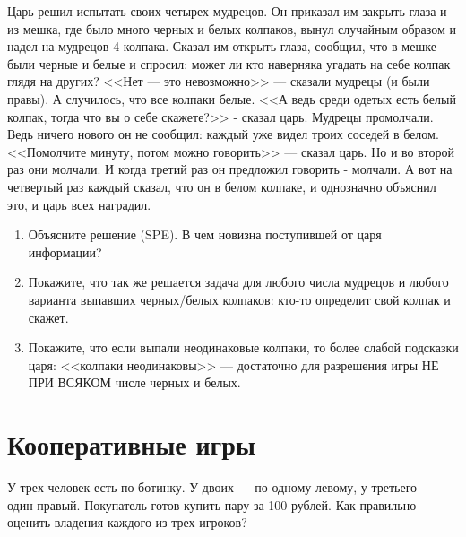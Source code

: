 \begin{problem} [Колпаки]
\begin{source} \cite{myerson:gtac} \end{source}
 Царь решил испытать своих
четырех мудрецов. Он приказал им закрыть глаза и из мешка,
где было много черных и белых колпаков, вынул случайным
образом и надел на мудрецов 4 колпака. Сказал им открыть
глаза, сообщил, что в мешке были черные и белые и спросил:
может ли кто наверняка угадать на себе колпак глядя на
других? <<Нет --- это невозможно>> --- сказали мудрецы (и были
правы). А случилось, что все колпаки белые. <<А ведь среди
одетых есть белый колпак, тогда что вы о себе скажете?>> -
сказал царь. Мудрецы промолчали. Ведь ничего нового он не
сообщил: каждый уже видел троих соседей в белом. <<Помолчите
минуту, потом можно говорить>> --- сказал царь. Но и во второй
раз они молчали. И когда третий раз он предложил говорить -
молчали. А вот на четвертый раз каждый сказал, что он в
белом колпаке, и однозначно объяснил это, и царь всех
наградил.

\begin{enumerate}

\item Объясните решение (SPE). В чем новизна
поступившей от царя информации?

\item Покажите, что так же
решается задача для любого числа мудрецов и любого варианта
выпавших черных/белых колпаков: кто-то определит свой
колпак и скажет.

\item Покажите, что если выпали неодинаковые
колпаки, то более слабой подсказки царя: <<колпаки
неодинаковы>> --- достаточно для разрешения игры НЕ ПРИ ВСЯКОМ
числе черных и белых.
\end{enumerate}



\begin{sol}

\end{sol}
\end{problem}






\section{Кооперативные игры}

\begin{problem}[Ботинки]
У трех человек есть по ботинку. У двоих --- по одному левому, у третьего --- один правый. Покупатель готов купить пару за 100 рублей. Как правильно оценить владения каждого из трех игроков?




\begin{sol}

\end{sol}
\end{problem}



